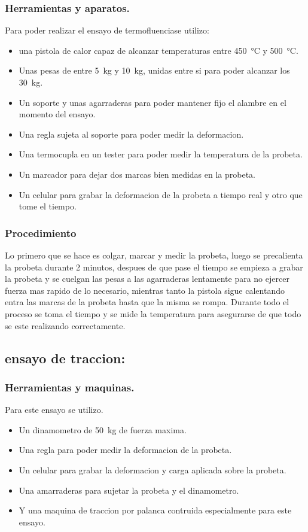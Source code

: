 \documentclass[12pt,a4paper]{article}
\begin{document}
\subsubsection{Herramientas y aparatos.}
Para poder realizar el ensayo de termofluenciase utilizo:
\begin{itemize}
    \item una pistola de calor capaz de alcanzar temperaturas entre \SI{450}{\celsius} y \SI{500}{\celsius}.
    \item Unas pesas de entre \SI{5}{\kilogram} y \SI{10}{\kilogram}, unidas entre si para poder alcanzar los \SI{30}{\kilogram}.
    \item Un soporte y unas agarraderas para poder mantener fijo el alambre en el momento del ensayo.
    \item Una regla sujeta al soporte para poder medir la deformacion.
    \item Una termocupla en un tester para poder medir la temperatura de la probeta.
    \item Un marcador para dejar dos marcas bien medidas en la probeta.
    \item Un celular para grabar la deformacion de la probeta a tiempo real y otro que tome el tiempo.
\end{itemize}

\subsubsection{Procedimiento}
Lo primero que se hace es colgar, marcar y medir la probeta, luego se precalienta la probeta durante 2 minutos, despues de que pase el tiempo se empieza a grabar la probeta y se cuelgan las pesas a las agarraderas lentamente para no ejercer fuerza mas rapido de lo necesario, mientras tanto la pistola sigue calentando entra las marcas de la probeta hasta que la misma se rompa. 
Durante todo el proceso se toma el tiempo y se mide la temperatura para asegurarse de que todo se este realizando correctamente.

\subsection{ensayo de traccion:}
\subsubsection{Herramientas y maquinas.}
Para este ensayo se utilizo.
\begin{itemize}
    \item Un dinamometro de \SI{50}{\kilogram} de fuerza maxima.
    \item Una regla para poder medir la deformacion de la probeta.
    \item Un celular para grabar la deformacion y carga aplicada sobre la probeta.
    \item Una amarraderas para sujetar la probeta y el dinamometro.
    \item Y una maquina de traccion por palanca contruida especialmente para este ensayo.
\end{itemize}
 
\end{document}
